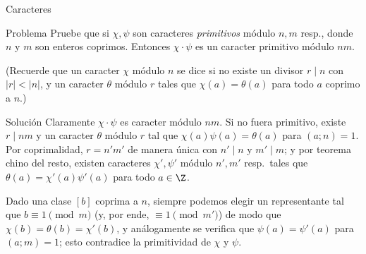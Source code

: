 \documentclass[handout, 10pt]{beamer}
\begin{document}
\begin{frame}{Caracteres}
	\begin{block}{Problema}
		Pruebe que si $\chi, \psi$ son caracteres \emph{primitivos} módulo $n, m$ resp., donde $n$ y $m$ son enteros coprimos.
		Entonces $\chi\cdot\psi$ es un caracter primitivo módulo $nm$.
	\end{block}
	\pause
	(Recuerde que un caracter $\chi$ módulo $n$ se dice  si no existe un divisor $r \mid n$ con $|r| < |n|$, y un
	caracter $\theta$ módulo $r$ tales que $\chi(a) = \theta(a)$ para todo $a$ coprimo a $n$.)
\end{frame}
\begin{frame}{Solución}
	Claramente $\chi\cdot\psi$ es caracter módulo $nm$.
	Si no fuera primitivo, existe $r \mid nm$ y un caracter $\theta$ módulo $r$ tal que $\chi(a)\psi(a) = \theta(a)$ para $(a; n) = 1$.
	\pause
	Por coprimalidad, $r = n'm'$ de manera única con $n' \mid n$ y $m' \mid m$;
	y por teorema chino del resto, existen caracteres $\chi', \psi'$ módulo $n', m'$ resp.\ tales que $\theta(a) = \chi'(a) \psi'(a)$
	para todo $a \in \Z$.

	\pause
	Dado una clase $[b]$ coprima a $n$, siempre podemos elegir un representante tal que $b \equiv 1 \pmod m$ (y, por ende, $\equiv 1
	\pmod{m'}$) de modo que $\chi(b) = \theta(b) = \chi'(b)$, y análogamente se verifica que $\psi(a) = \psi'(a)$ para $(a; m) = 1$;
	esto contradice la primitividad de $\chi$ y $\psi$.
\end{frame}
\end{document}
